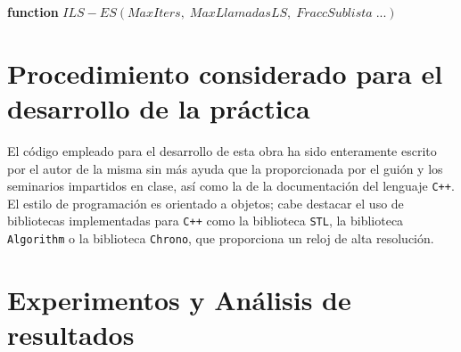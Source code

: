 \documentclass[11pt,a4paper]{article}
\begin{document}
	\begin{algorithm}
		
		\textbf{function} $ILS-ES(MaxIters,\;MaxLlamadasLS,\;FraccSublista\;...)$
		
	\end{algorithm}
	
\section{Procedimiento considerado para el desarrollo de la práctica}

\noindent El código empleado para el desarrollo de esta obra ha sido enteramente escrito por el autor de la misma sin más ayuda que la proporcionada por el guión y los seminarios impartidos en clase, así como la de la documentación del lenguaje \texttt{C++}.\\

\noindent El estilo de programación es orientado a objetos; cabe destacar el uso de bibliotecas implementadas para \texttt{C++} como la biblioteca \texttt{STL}, la biblioteca \texttt{Algorithm} o la biblioteca \texttt{Chrono}, que proporciona un reloj de alta resolución.\\

\section{Experimentos y Análisis de resultados}
\end{document}
